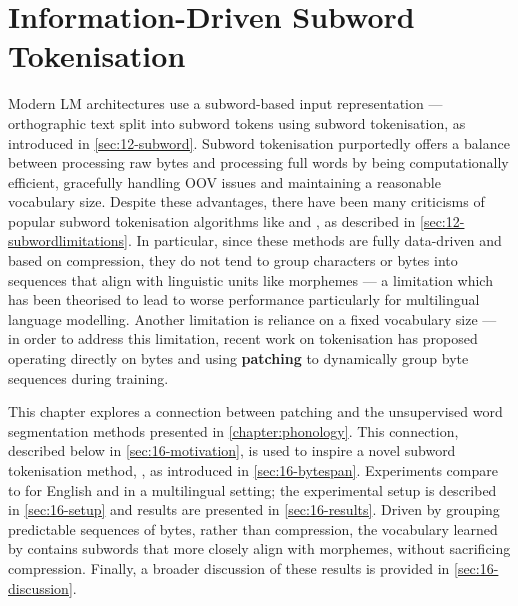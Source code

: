 \chapter{Information-Driven Subword Tokenisation}\label{chapter:infotokenisation}

Modern LM architectures use a subword-based input representation --- orthographic text split into subword tokens using subword tokenisation, as introduced in \cref{sec:12-subword}. Subword tokenisation purportedly offers a balance between processing raw bytes and processing full words by being computationally efficient, gracefully handling OOV issues and maintaining a reasonable vocabulary size. Despite these advantages, there have been many criticisms of popular subword tokenisation algorithms like \bpe and \wordpiecefull, as described in \cref{sec:12-subwordlimitations}. In particular, since these methods are fully data-driven and based on compression, they do not tend to group characters or bytes into sequences that align with linguistic units like morphemes --- a limitation which has been theorised to lead to worse performance particularly for multilingual language modelling. Another limitation is reliance on a fixed vocabulary size --- in order to address this limitation, recent work on tokenisation has proposed operating directly on bytes and using \textbf{patching} to dynamically group byte sequences during training.

This chapter explores a connection between patching and the unsupervised word segmentation methods presented in \cref{chapter:phonology}. This connection, described below in \cref{sec:16-motivation}, is used to inspire a novel subword tokenisation method, \bytespan, as introduced in \cref{sec:16-bytespan}.  Experiments compare \bytespan to \bpe for English and in a multilingual setting; the experimental setup is described in \cref{sec:16-setup} and results are presented in \cref{sec:16-results}. Driven by grouping predictable sequences of bytes, rather than compression, the vocabulary learned by \bytespan contains subwords that more closely align with morphemes, without sacrificing compression. Finally, a broader discussion of these results is provided in \cref{sec:16-discussion}.


